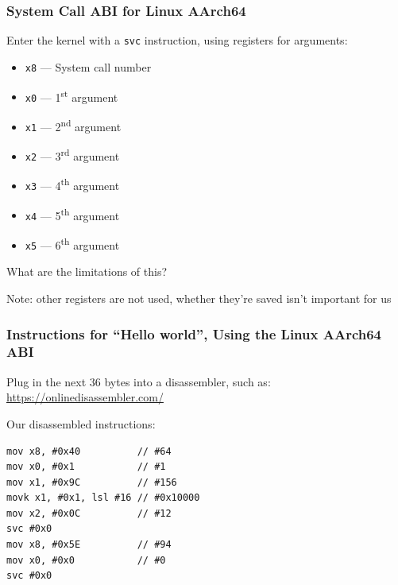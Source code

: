   \begin{frame}
    \frametitle{System Call ABI for Linux AArch64}

    Enter the kernel with a \texttt{svc} instruction, using registers for
    arguments:

    \begin{itemize}
      \item \texttt{x8} --- System call number
      \item \texttt{x0} --- 1\textsuperscript{st} argument
      \item \texttt{x1} --- 2\textsuperscript{nd} argument
      \item \texttt{x2} --- 3\textsuperscript{rd} argument
      \item \texttt{x3} --- 4\textsuperscript{th} argument
      \item \texttt{x4} --- 5\textsuperscript{th} argument
      \item \texttt{x5} --- 6\textsuperscript{th} argument
    \end{itemize}

    What are the limitations of this?

    \vspace{2em}

    Note: other registers are not used, whether they're saved isn't important
    for us
  \end{frame}

  \begin{frame}[fragile]
    \frametitle{Instructions for ``Hello world'', Using the Linux AArch64 ABI}

    Plug in the next 36 bytes into a disassembler, such as:
    \url{https://onlinedisassembler.com/}

    \vspace{2em}

    Our disassembled instructions:
    \begin{lstlisting}[xleftmargin=2em]
mov x8, #0x40          // #64
mov x0, #0x1           // #1
mov x1, #0x9C          // #156
movk x1, #0x1, lsl #16 // #0x10000
mov x2, #0x0C          // #12
svc #0x0
mov x8, #0x5E          // #94
mov x0, #0x0           // #0
svc #0x0
    \end{lstlisting}
  \end{frame}

